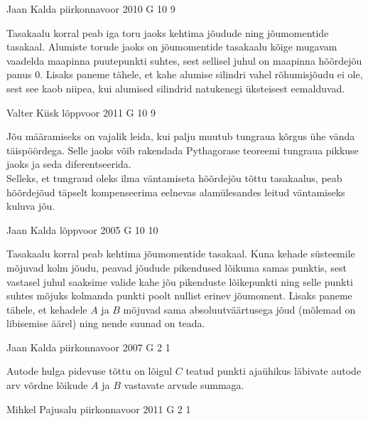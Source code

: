\documentclass[11pt, twoside]{article}
\begin{document}
{%
{Jaan Kalda} %
{piirkonnavoor} %
{2010} %
{G 10} %
{9} %
{

\ifHint
Tasakaalu korral peab iga toru jaoks kehtima jõudude ning jõumomentide tasakaal. Alumiste torude jaoks on jõumomentide tasakaalu kõige mugavam vaadelda maapinna puutepunkti suhtes, sest sellisel juhul on maapinna hõõrdejõu panus \num{0}. Lisaks paneme tähele, et kahe alumise silindri vahel rõhumisjõudu ei ole, sest see kaob niipea, kui alumised silindrid natukenegi üksteisest eemalduvad.
\fi
}

{Valter Kiisk} %
{lõppvoor} %
{2011} %
{G 10} %
{9} %
{

\ifHint
\osa Jõu määramiseks on vajalik leida, kui palju muutub tungraua kõrgus ühe vända täispöördega. Selle jaoks võib rakendada Pythagorase teoreemi tungraua pikkuse jaoks ja seda diferentseerida.\\
\osa Selleks, et tungraud oleks ilma väntamiseta hõõrdejõu tõttu tasakaalus, peab hõõrdejõud täpselt kompenseerima eelnevas alamülesandes leitud väntamiseks kuluva jõu.
\fi
}

{Jaan Kalda} %
{lõppvoor} %
{2005} %
{G 10} %
{10} %
{

\ifHint
Tasakaalu korral peab kehtima jõumomentide tasakaal. Kuna kehade süsteemile mõjuvad kolm jõudu, peavad jõudude pikendused lõikuma samas punktis, sest vastasel juhul saaksime valide kahe jõu pikenduste lõikepunkti ning selle punkti suhtes mõjuks kolmanda punkti poolt nullist erinev jõumoment. Lisaks paneme tähele, et kehadele $A$ ja $B$ mõjuvad sama absoluutväärtusega jõud (mõlemad on libisemise äärel) ning nende suunad on teada.
\fi
}

{Jaan Kalda} %
{piirkonnavoor} %
{2007} %
{G 2} %
{1} %
{

\ifHint
Autode hulga pidevuse tõttu on lõigul $C$ teatud punkti ajaühikus läbivate autode arv võrdne lõikude $A$ ja $B$ vastavate arvude summaga.
\fi
}

{Mihkel Pajusalu} %
{piirkonnavoor} %
{2011} %
{G 2} %
{1} %
{

}}
\end{document}
